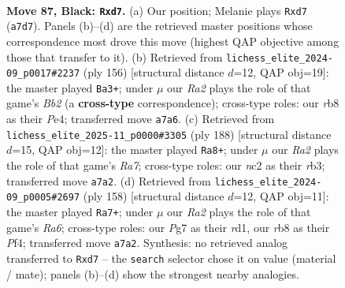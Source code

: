 \documentclass[11pt]{article}
\begin{document}
\clearpage

\begin{figure}[p]\centering
\begin{subfigure}{0.46\textwidth}\centering
\resizebox{\linewidth}{!}{%
\newchessgame
\chessboard[
  setfen={1R6/r2P2p1/5p2/3k3p/7P/6P1/2N5/7K b - - 0 87},
  showmover=false,
  pgfstyle=straightmove, color=movearrow, markmove={a7-d7}
]}
\caption{}
\end{subfigure}\hfill
\begin{subfigure}{0.46\textwidth}\centering
\resizebox{\linewidth}{!}{%
\newchessgame
\chessboard[
  setfen={8/8/p2k4/4p2p/P3P2P/8/1B2K2n/8 w - - 34 79},
  showmover=false,
  pgfstyle=straightmove, color=movearrow, markmove={b2-a3}
]}
\caption{}
\end{subfigure}
\\[4pt]
\begin{subfigure}{0.46\textwidth}\centering
\resizebox{\linewidth}{!}{%
\newchessgame
\chessboard[
  setfen={6k1/R5p1/7p/7P/6P1/1r6/5K2/8 w - - 45 95},
  showmover=false,
  pgfstyle=straightmove, color=movearrow, markmove={a7-a8}
]}
\caption{}
\end{subfigure}\hfill
\begin{subfigure}{0.46\textwidth}\centering
\resizebox{\linewidth}{!}{%
\newchessgame
\chessboard[
  setfen={8/2k2p2/R5p1/7p/2K2P1P/6P1/8/3r4 w - - 0 80},
  showmover=false,
  pgfstyle=straightmove, color=movearrow, markmove={a6-a7}
]}
\caption{}
\end{subfigure}
\caption{\textbf{Move 87, Black: \texttt{Rxd7}.} (a) Our position; Melanie plays \texttt{Rxd7} (\texttt{a7d7}). Panels (b)--(d) are the retrieved master positions whose correspondence most drove this move (highest QAP objective among those that transfer to it). (b) Retrieved from \texttt{lichess\_elite\_2024-09\_p0017\#2237} (ply 156) [structural distance $d$=12, QAP obj=19]: the master played \texttt{Ba3+}; under $\mu$ our \emph{Ra2} plays the role of that game's \emph{Bb2} (a \textbf{cross-type} correspondence); cross-type roles: our \emph{r}b8 as their \emph{P}e4; transferred move \texttt{a7a6}. (c) Retrieved from \texttt{lichess\_elite\_2025-11\_p0000\#3305} (ply 188) [structural distance $d$=15, QAP obj=12]: the master played \texttt{Ra8+}; under $\mu$ our \emph{Ra2} plays the role of that game's \emph{Ra7}; cross-type roles: our \emph{n}c2 as their \emph{r}b3; transferred move \texttt{a7a2}. (d) Retrieved from \texttt{lichess\_elite\_2024-09\_p0005\#2697} (ply 158) [structural distance $d$=12, QAP obj=11]: the master played \texttt{Ra7+}; under $\mu$ our \emph{Ra2} plays the role of that game's \emph{Ra6}; cross-type roles: our \emph{P}g7 as their \emph{r}d1, our \emph{r}b8 as their \emph{P}f4; transferred move \texttt{a7a2}. Synthesis: no retrieved analog transferred to \texttt{Rxd7} -- the \texttt{search} selector chose it on value (material / mate); panels (b)--(d) show the strongest nearby analogies.}
\label{fig:thought-m173}
\end{figure}
\end{document}
